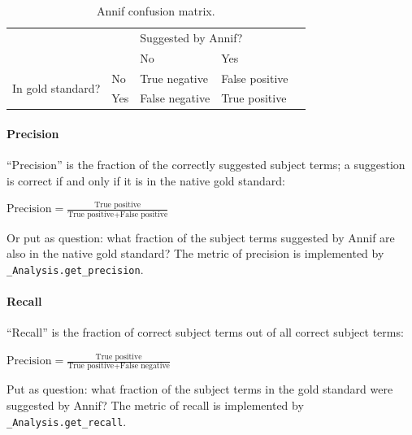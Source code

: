 \begin{table}[h]
\centering
\begin{tabular}{lllll}
 &                       & \multicolumn{2}{l}{Suggested by Annif?}            &  \\ \cline{3-4}
 & \multicolumn{1}{l|}{} & \multicolumn{1}{l|}{No} & \multicolumn{1}{l|}{Yes} &  \\ \cline{2-4}
\multicolumn{1}{l|}{\multirow{2}{*}{In gold standard?}} & \multicolumn{1}{l|}{No}  & \multicolumn{1}{l|}{True negative}  & \multicolumn{1}{l|}{False positive} &  \\ \cline{2-4}
\multicolumn{1}{l|}{}                                   & \multicolumn{1}{l|}{Yes} & \multicolumn{1}{l|}{False negative} & \multicolumn{1}{l|}{True positive}  &  \\ \cline{2-4}
\end{tabular}
\caption{Annif confusion matrix.}
\label{tab:confusion-matrix}
\end{table}

\hypertarget{precision}{%
\paragraph{Precision}\label{precision}}

``Precision'' is the fraction of the correctly suggested subject terms;
a suggestion is correct if and only if it is in the native gold
standard:

\(\text{Precision} = \displaystyle \frac{\text{True positive}}{\text{True positive} + \text{False positive}}\)

Or put as question: what fraction of the subject terms suggested by
Annif are also in the native gold standard? The metric of precision is
implemented by \texttt{\_Analysis.get\_precision}.

\hypertarget{recall}{%
\paragraph{Recall}\label{recall}}

``Recall'' is the fraction of correct subject terms out of all correct
subject terms:

\(\text{Precision} = \displaystyle \frac{\text{True positive}}{\text{True positive} + \text{False negative}}\)

Put as question: what fraction of the subject terms in the gold standard
were suggested by Annif? The metric of recall is implemented by
\texttt{\_Analysis.get\_recall}.

